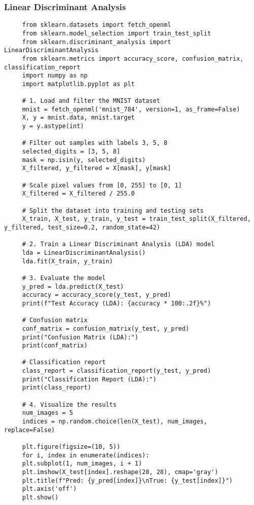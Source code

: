 \documentclass[letterpaper]{article}
\begin{document}
\subsubsection{Linear Discriminant Analysis}
\begin{lstlisting}
     from sklearn.datasets import fetch_openml
     from sklearn.model_selection import train_test_split
     from sklearn.discriminant_analysis import LinearDiscriminantAnalysis
     from sklearn.metrics import accuracy_score, confusion_matrix, classification_report
     import numpy as np
     import matplotlib.pyplot as plt
     
     # 1. Load and filter the MNIST dataset
     mnist = fetch_openml('mnist_784', version=1, as_frame=False)
     X, y = mnist.data, mnist.target
     y = y.astype(int)
     
     # Filter out samples with labels 3, 5, 8
     selected_digits = [3, 5, 8]
     mask = np.isin(y, selected_digits)
     X_filtered, y_filtered = X[mask], y[mask]
     
     # Scale pixel values from [0, 255] to [0, 1]
     X_filtered = X_filtered / 255.0
     
     # Split the dataset into training and testing sets
     X_train, X_test, y_train, y_test = train_test_split(X_filtered, y_filtered, test_size=0.2, random_state=42)
     
     # 2. Train a Linear Discriminant Analysis (LDA) model
     lda = LinearDiscriminantAnalysis()
     lda.fit(X_train, y_train)
     
     # 3. Evaluate the model
     y_pred = lda.predict(X_test)
     accuracy = accuracy_score(y_test, y_pred)
     print(f"Test Accuracy (LDA): {accuracy * 100:.2f}%")
     
     # Confusion matrix
     conf_matrix = confusion_matrix(y_test, y_pred)
     print("Confusion Matrix (LDA):")
     print(conf_matrix)
     
     # Classification report
     class_report = classification_report(y_test, y_pred)
     print("Classification Report (LDA):")
     print(class_report)
     
     # 4. Visualize the results
     num_images = 5
     indices = np.random.choice(len(X_test), num_images, replace=False)
     
     plt.figure(figsize=(10, 5))
     for i, index in enumerate(indices):
     plt.subplot(1, num_images, i + 1)
     plt.imshow(X_test[index].reshape(28, 28), cmap='gray')
     plt.title(f"Pred: {y_pred[index]}\nTrue: {y_test[index]}")
     plt.axis('off')
     plt.show()
\end{lstlisting}
\end{document}
